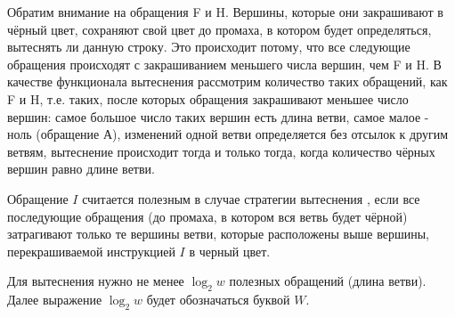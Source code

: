 Обратим внимание на обращения F и H. Вершины, которые они закрашивают в чёрный цвет, сохраняют свой цвет до промаха, в котором будет определяться, вытеснять ли данную строку. Это происходит потому, что все следующие обращения происходят с закрашиванием меньшего числа вершин, чем F и H. В качестве функционала вытеснения рассмотрим количество таких обращений, как F и H, т.е. таких, после которых обращения закрашивают меньшее число вершин: самое большое число таких вершин есть длина ветви, самое малое - ноль (обращение А), изменений одной ветви определяется без отсылок к другим ветвям, вытеснение происходит тогда и только тогда, когда количество чёрных вершин равно длине ветви.

%

\begin{utv}
Обращение $I$ считается полезным в случае стратегии вытеснения \PseudoLRU, если все последующие обращения (до промаха, в котором вся ветвь будет чёрной) затрагивают только те вершины ветви, которые расположены выше вершины, перекрашиваемой инструкцией $I$ в черный цвет.
\end{utv}

Для вытеснения нужно не менее $\log_2 w$ полезных обращений (длина ветви). Далее выражение $\log_2 w$ будет обозначаться буквой $W$.

%
%
%


